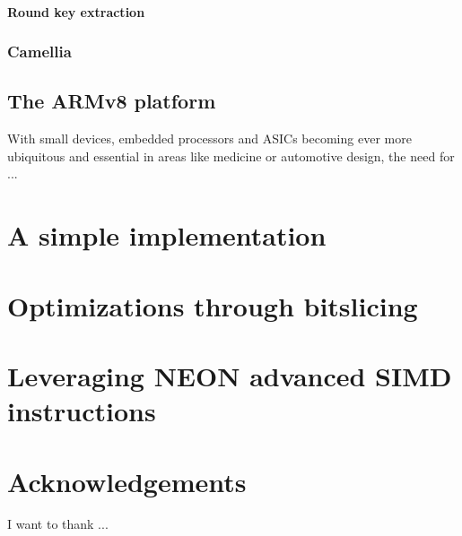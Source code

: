 \documentclass[12pt]{report}
\begin{document}
\subsubsection{Round key extraction}

\subsection{Camellia}

\section{The ARMv8 platform}

With small devices, embedded processors and ASICs becoming ever more ubiquitous
and essential in areas like medicine or automotive design, the need for ...

\chapter{A simple implementation}

\chapter{Optimizations through bitslicing}

\chapter{Leveraging NEON advanced SIMD instructions}

\chapter*{Acknowledgements}

I want to thank ...
\end{document}
